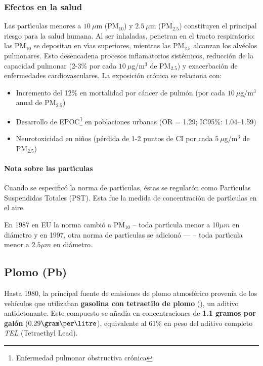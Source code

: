 \subsubsection{Efectos en la salud} 
Las part\'{\i}culas menores a $10\ \mu$m (PM$_{10}$) y $2.5\ \mu$m (PM$_{2.5}$) constituyen el principal riesgo para la salud humana. Al ser inhaladas, penetran en el tracto respiratorio: las PM$_{10}$ se depositan en v\'{\i}as superiores, mientras las PM$_{2.5}$ alcanzan los alv\'eolos pulmonares. Esto desencadena procesos inflamatorios sist\'emicos, reducci\'on de la capacidad pulmonar (2-3\% por cada $10\ \mu$g/m$^3$ de PM$_{2.5}$) y exacerbaci\'on de enfermedades cardiovasculares. La exposici\'on cr\'onica se relaciona con:
\begin{itemize}
    \item Incremento del 12\% en mortalidad por c\'ancer de pulm\'on (por cada $10\ \mu$g/m$^3$ anual de PM$_{2.5}$) 
    \item Desarrollo de EPOC\footnote{Enfermedad pulmonar obstructiva crónica} en poblaciones urbanas (OR = 1.29; IC95\%: 1.04–1.59)
    \item Neurotoxicidad en ni\~nos (p\'erdida de 1-2 puntos de CI por cada $5\ \mu$g/m$^3$ de PM$_{2.5}$)
\end{itemize}

\paragraph{Nota sobre las part\'{\i}culas}
Cuando se especific\'o la norma de part\'{\i}culas, \'estas se regular\'on como Part\'{\i}culas Suspendidas Totales (PST). Esta fue la medida de concentraci\'on de part\'{\i}culas en el aire.

En 1987 en EU la norma cambi\'o a PM$_{10}$ -- toda part\'{\i}cula menor a 10$\mu m$ en di\'ametro y en 1997, otra norma de part\'{\i}culas se adicion\'o ---  -- toda part\'{\i}cula menor a $2.5\mu m$ en di\'ametro.

\subsection{Plomo (Pb)}
Hasta 1980, la principal fuente de emisiones de plomo atmosférico provenía de los vehículos que utilizaban \textbf{gasolina con tetraetilo de plomo} (), un aditivo antidetonante. Este compuesto se añadía en concentraciones de \textbf{1.1 gramos por galón} ($ 0.29 \gram\per\litre$), equivalente al 61\% en peso del aditivo completo \textit{TEL} (Tetraethyl Lead). 

